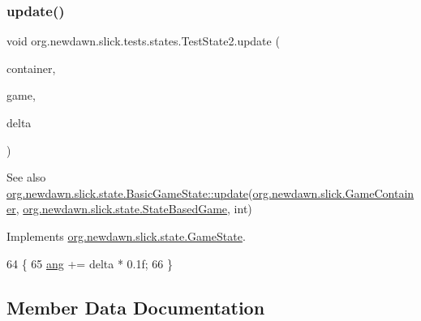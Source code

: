\subsubsection{\texorpdfstring{update()}{update()}}
{\footnotesize\ttfamily void org.\+newdawn.\+slick.\+tests.\+states.\+Test\+State2.\+update (\begin{DoxyParamCaption}\item[{\mbox{\hyperlink{classorg_1_1newdawn_1_1slick_1_1_game_container}{Game\+Container}}}]{container,  }\item[{\mbox{\hyperlink{classorg_1_1newdawn_1_1slick_1_1state_1_1_state_based_game}{State\+Based\+Game}}}]{game,  }\item[{int}]{delta }\end{DoxyParamCaption})\hspace{0.3cm}{\ttfamily [inline]}}

\begin{DoxySeeAlso}{See also}
\mbox{\hyperlink{interfaceorg_1_1newdawn_1_1slick_1_1state_1_1_game_state_ab5ec3bc37a9bd1eb5679577408c562c1}{org.\+newdawn.\+slick.\+state.\+Basic\+Game\+State\+::update}}(\mbox{\hyperlink{classorg_1_1newdawn_1_1slick_1_1_game_container}{org.\+newdawn.\+slick.\+Game\+Container}}, \mbox{\hyperlink{classorg_1_1newdawn_1_1slick_1_1state_1_1_state_based_game}{org.\+newdawn.\+slick.\+state.\+State\+Based\+Game}}, int) 
\end{DoxySeeAlso}


Implements \mbox{\hyperlink{interfaceorg_1_1newdawn_1_1slick_1_1state_1_1_game_state_ab5ec3bc37a9bd1eb5679577408c562c1}{org.\+newdawn.\+slick.\+state.\+Game\+State}}.


\begin{DoxyCode}
64                                                                                 \{
65         \mbox{\hyperlink{classorg_1_1newdawn_1_1slick_1_1tests_1_1states_1_1_test_state2_a68f880036b5ae74ff1be02476e1758a2}{ang}} += delta * 0.1f;
66     \}
\end{DoxyCode}


\subsection{Member Data Documentation}
\mbox{\label{classorg_1_1newdawn_1_1slick_1_1tests_1_1states_1_1_test_state2_a68f880036b5ae74ff1be02476e1758a2}} 
